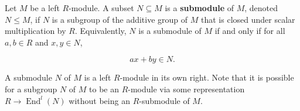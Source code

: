 Let $M$ be a left $R$-module. A subset $N \subseteq M$ is a \textbf{submodule} of $M$, denoted $N \leq M$, if $N$ is a subgroup of the additive group of $M$ that is closed under scalar multiplication by $R$. Equivalently, $N$ is a submodule of $M$ if and only if for all $a, b \in R$ and $x, y \in N$,

$$ax + by \in N.$$

A submodule $N$ of $M$ is a left $R$-module in its own right. Note that it is possible for a subgroup $N$ of $M$ to be an $R$-module via some representation $R \to \operatorname{End}^l(N)$ without being an $R$-submodule of $M$.

